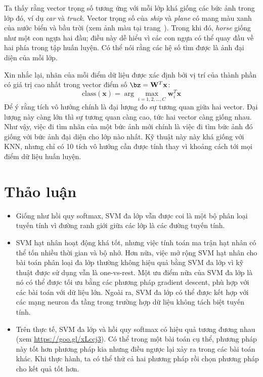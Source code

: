 Ta thấy rằng vector trọng số tương ứng với mỗi lớp khá giống các bức
ảnh trong lớp đó, ví dụ \textit{car} và \textit{truck}. Vector trọng số của
\textit{ship} và \textit{plane} có mang màu xanh của nước biển và bầu trời (xem
ảnh màu tại trang~\pageref{fig:22_9_c}). Trong khi đó, \textit{horse} giống như
một con ngựa hai đầu; điều này dễ hiểu vì các con ngựa có
thể quay đầu về hai phía trong tập huấn luyện. Có thể nói rằng các hệ số tìm được là ảnh đại diện của mỗi lớp. 
 
Xin nhắc lại, nhãn của mỗi điểm dữ liệu được xác định bởi vị trí của thành phần có giá trị cao nhất trong vector điểm số $\bz = \mathbf{W}^T\mathbf{x}$:
\begin{equation*} 
\text{class}(\mathbf{x}) = \arg\max_{i = 1, 2, \dots, C} \mathbf{w}_i^T\mathbf{x} 
\end{equation*} 
Để ý rằng tích vô hướng chính là đại lượng đo sự tương quan giữa hai vector. Đại
lượng này càng lớn thì sự tương quan càng cao, tức hai vector càng giống nhau.
Như vậy, việc đi tìm nhãn của một bức ảnh mới chính là việc đi tìm bức ảnh đó
giống với bức ảnh {đại diện} cho lớp nào nhất. Kỹ thuật này này khá giống
với KNN, nhưng chỉ có 10 tích vô hướng cần được tính thay vì khoảng cách tới mọi điểm dữ liệu huấn luyện. 
 
 
\section{Thảo luận }
\begin{itemize}
    \item Giống như hồi quy softmax, SVM đa lớp vẫn được coi là một bộ
    phân loại tuyến tính vì đường ranh giới giữa các lớp là các đường tuyến tính.
     
    \item SVM hạt nhân hoạt động khá tốt, nhưng việc tính toán ma trận hạt nhân có thể tốn nhiều thời gian và bộ nhớ. Hơn nữa, việc mở rộng SVM hạt nhân cho bài toán phân loại đa lớp thường không hiệu quả bằng SVM đa lớp 
    vì kỹ thuật được sử dụng vẫn là one-vs-rest. Một ưu điểm nữa của     SVM đa lớp là nó có thể được tối ưu bằng các phương pháp gradient descent, phù hợp
    với các bài toán với dữ liệu lớn. Ngoài ra, SVM đa lớp có thể được kết hợp với các mạng neuron đa tầng trong trường hợp dữ liệu không tách biệt tuyến tính. 

     
    \item  Trên thực tế, SVM đa lớp và hồi quy softmax có hiệu quả tương
    đương nhau (xem \url{https://goo.gl/xLccj3}). Có thể trong một bài toán cụ
    thể, phương pháp này tốt hơn phương pháp kia nhưng điều ngược lại xảy ra
    trong các bài toán khác. Khi thực hành, ta có thể thử cả hai
    phương pháp rồi chọn phương pháp cho kết quả tốt hơn.
\end{itemize}
 
